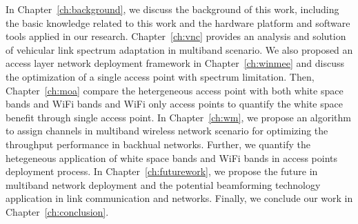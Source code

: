 In Chapter~\ref{ch:background}, we discuss the background of this work, 
including the basic knowledge related to this work and the hardware 
platform and software tools applied in our research. Chapter~\ref{ch:vnc} 
provides an analysis and solution of vehicular link spectrum adaptation in 
multiband scenario. We also proposed an access layer network deployment 
framework in Chapter~\ref{ch:winmee} and discuss the optimization of a 
single access point with spectrum limitation. Then, Chapter~\ref{ch:moa} 
compare the hetergeneous access point with both white space bands and WiFi 
bands and WiFi only access points to quantify the white space benefit 
through single access point. In Chapter~\ref{ch:wm}, we propose an 
algorithm to assign channels in multiband wireless network scenario for 
optimizing the throughput performance in backhual networks. Further, we 
quantify the hetegeneous application of white space bands and WiFi bands 
in access points deployment process. In Chapter~\ref{ch:futurework}, we 
propose the future in multiband network deployment and the potential 
beamforming technology application in link communication and networks. 
Finally, we conclude our work in Chapter~\ref{ch:conclusion}.

